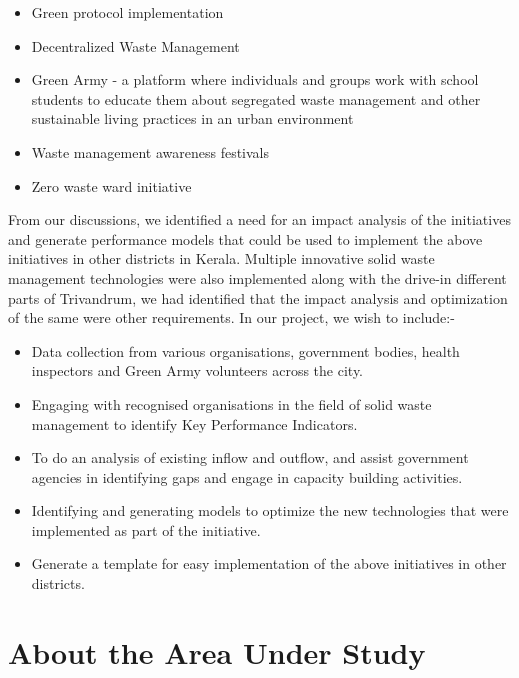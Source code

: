 \documentclass[12pt,a4paper]{report}
\begin{document}
\vspace{5mm}

\begin{itemize}
\item Green protocol implementation
\item Decentralized Waste Management
\item Green Army - a platform where individuals and groups work with school students to educate them about  segregated waste management and other sustainable living practices in an urban environment
\item Waste management awareness festivals
\item Zero waste ward initiative
\end{itemize}

\vspace{5mm}

\begin{justify}
From our discussions, we identified a need for an impact analysis of the initiatives and generate performance models that could be used to implement the above initiatives in other districts in Kerala. Multiple innovative solid waste management technologies were also implemented along with the drive-in different parts of Trivandrum, we had identified that the impact analysis and optimization of the same were other requirements.
In our project, we wish to include:-
\end{justify}

\begin{itemize}
\item Data collection from various organisations, government bodies, health inspectors and Green Army volunteers across the city.
\item Engaging with recognised organisations in the field of solid waste management to identify Key Performance Indicators.
\item To do an analysis of existing inflow and outflow, and assist government agencies in identifying gaps and engage in capacity building activities.
\item Identifying and generating models to optimize the new technologies that were implemented as part of the initiative.
\item Generate a template for easy implementation of the above initiatives in other districts.
\end{itemize}



\chapter{\textbf{About the Area Under Study}}
\end{document}
